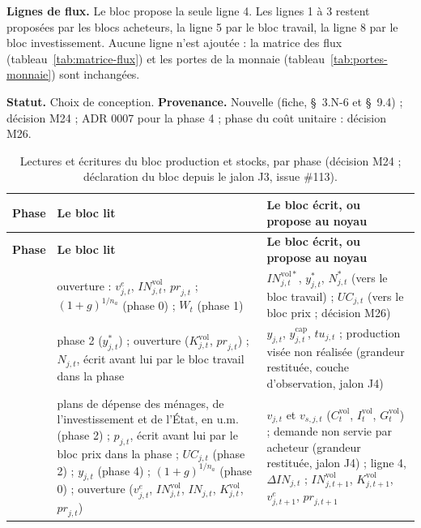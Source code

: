 \documentclass[11pt,a4paper]{article}
\begin{document}
\textbf{Lignes de flux.} Le bloc propose la seule ligne 4. Les lignes 1 à 3 restent proposées par les blocs acheteurs, la ligne 5 par le bloc travail, la ligne 8 par le bloc investissement. Aucune ligne n'est ajoutée : la matrice des flux (tableau~\ref{tab:matrice-flux}) et les portes de la monnaie (tableau~\ref{tab:portes-monnaie}) sont inchangées.

\textbf{Statut.} Choix de conception. \textbf{Provenance.} Nouvelle (fiche, \S~3.N-6 et \S~9.4) ; décision M24 ; ADR 0007 pour la phase 4 ; phase du coût unitaire : décision M26.

\begin{center}\small
\begin{longtable}{>{\raggedright\arraybackslash}p{1.1cm}>{\raggedright\arraybackslash}p{6.9cm}>{\raggedright\arraybackslash}p{6.9cm}}
\caption{Lectures et écritures du bloc production et stocks, par phase (décision M24 ; déclaration du bloc depuis le jalon J3, issue \#113).}\label{tab:production-phases}\\
\toprule
\textbf{Phase} & \textbf{Le bloc lit} & \textbf{Le bloc écrit, ou propose au noyau}\\
\midrule
\endfirsthead
\toprule
\textbf{Phase} & \textbf{Le bloc lit} & \textbf{Le bloc écrit, ou propose au noyau}\\
\midrule
\endhead
2 & ouverture : $v^e_{j,t}$, $\mathit{IN}^{\mathrm{vol}}_{j,t}$, $\mathit{pr}_{j,t}$ ; $(1 + g)^{1/n_a}$ (phase 0) ; $W_t$ (phase 1) & $\mathit{IN}^{\mathrm{vol}\ast}_{j,t}$, $y^{\ast}_{j,t}$, $N^{\ast}_{j,t}$ (vers le bloc travail) ; $\mathit{UC}_{j,t}$ (vers le bloc prix ; décision M26)\\
4 & phase 2 ($y^{\ast}_{j,t}$) ; ouverture ($K^{\mathrm{vol}}_{j,t}$, $\mathit{pr}_{j,t}$) ; $N_{j,t}$, écrit avant lui par le bloc travail dans la phase & $y_{j,t}$, $y^{\mathrm{cap}}_{j,t}$, $\mathit{tu}_{j,t}$ ; production visée non réalisée (grandeur restituée, couche d'observation, jalon J4)\\
5 & plans de dépense des ménages, de l'investissement et de l'État, en u.m. (phase 2) ; $p_{j,t}$, écrit avant lui par le bloc prix dans la phase ; $\mathit{UC}_{j,t}$ (phase 2) ; $y_{j,t}$ (phase 4) ; $(1 + g)^{1/n_a}$ (phase 0) ; ouverture ($v^e_{j,t}$, $\mathit{IN}^{\mathrm{vol}}_{j,t}$, $\mathit{IN}_{j,t}$, $K^{\mathrm{vol}}_{j,t}$, $\mathit{pr}_{j,t}$) & $v_{j,t}$ et $v_{s,j,t}$ ($C^{\mathrm{vol}}_t$, $I^{\mathrm{vol}}_t$, $G^{\mathrm{vol}}_t$) ; demande non servie par acheteur (grandeur restituée, jalon J4) ; ligne 4, $\Delta\mathit{IN}_{j,t}$ ; $\mathit{IN}^{\mathrm{vol}}_{j,t+1}$, $K^{\mathrm{vol}}_{j,t+1}$, $v^e_{j,t+1}$, $\mathit{pr}_{j,t+1}$\\
\bottomrule
\end{longtable}
\end{center}
\end{document}
